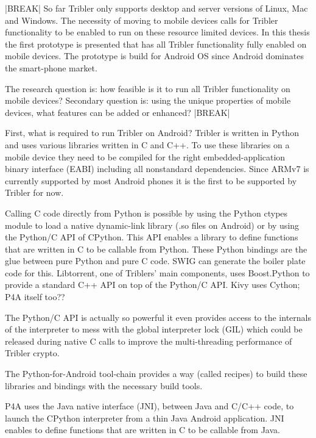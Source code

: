 |BREAK|
So far Tribler only supports desktop and server versions of Linux, Mac and Windows.
The necessity of moving to mobile devices calls for Tribler functionality to be enabled to run on these resource limited devices.
In this thesis the first prototype is presented that has all Tribler functionality fully enabled on mobile devices.
The prototype is build for Android OS since Android dominates the smart-phone market.

The research question is: how feasible is it to run all Tribler functionality on mobile devices? %
Secondary question is: using the unique properties of mobile devices, what features can be added or enhanced?
|BREAK|

First, what is required to run Tribler on Android?
Tribler is written in Python and uses various libraries written in C and C++.
To use these libraries on a mobile device they need to be compiled for the right embedded-application binary interface (EABI) including all nonstandard dependencies.
Since ARMv7 is currently supported by most Android phones it is the first to be supported by Tribler for now.


Calling C code directly from Python is possible by using the Python ctypes module to load a native dynamic-link library (.so files on Android) or by using the Python/C API of CPython.
This API enables a library to define functions that are written in C to be callable from Python.
These Python bindings are the glue between pure Python and pure C code.
SWIG can generate the boiler plate code for this.
Libtorrent, one of Triblers' main components, uses Boost.Python to provide a standard C++ API on top of the Python/C API.
Kivy uses Cython; P4A itself too??

The Python/C API is actually so powerful it even provides access to the internals of the interpreter to mess with the global interpreter lock (GIL) which could be released during native C calls to improve the multi-threading performance of Tribler crypto.

The Python-for-Android tool-chain provides a way (called recipes) to build these libraries and bindings with the necessary build tools.

P4A uses the Java native interface (JNI), between Java and C/C++ code, to launch the CPython interpreter from a thin Java Android application.
JNI enables to define functions that are written in C to be callable from Java.



